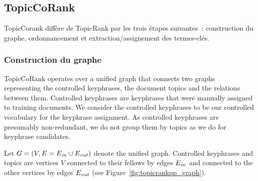     \subsection{TopicCoRank}
    \label{subsec:main-automatic_keyphrase_annotation-supervised_automatic_keyphrase_annotation-topiccorank}
      TopicCorank diffère de TopicRank par les trois étapes suivantes~:
      construction du graphe, ordonnancement et extraction/assignement des
      termes-clés.  

      \subsubsection{Construction du graphe}
      \label{subsubsec:main-automatic_keyphrase_annotation-supervised_automatic_keyphrase_extraction-topiccorank-graph_construction}
        TopicCoRank operates over a unified graph that connects two graphs
        representing the controlled keyphrases, the document topics and
        the relations between them. Controlled keyphrases are keyphrases
        that were manually assigned to training documents. We consider the 
        controlled keyphrases
        to be our controlled vocabulary for the keyphrase assignment. %
        As controlled keyphrases are presumably non-redundant, we do not 
        group them by topics as we do for keyphrase candidates.
        
        Let
        $G = (V, E=E_{\textnormal{\textit{in}}} \cup E_{\textnormal{\textit{out}}})$
        denote the unified graph. Controlled keyphrases and topics are vertices $V$
        connected to their fellows by edges $E_\textnormal{\textit{in}}$ and
        connected to the other vertices by edges $E_\textnormal{\textit{out}}$ (see
        Figure~\ref{fig:topicrankpp_graph}).
        

